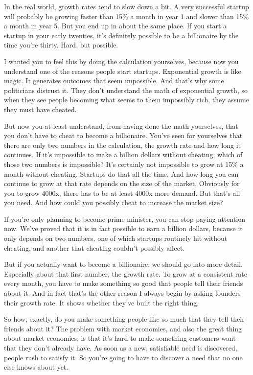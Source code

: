 \documentclass[12pt]{book}
\begin{document}
In the real world, growth rates tend to slow down a bit. A very
successful startup will probably be growing faster than 15\% a month in
year 1 and slower than 15\% a month in year 5. But you end up in about
the same place. If you start a startup in your early twenties, it's
definitely possible to be a billionaire by the time you're thirty. Hard,
but possible.

I wanted you to feel this by doing the calculation yourselves, because
now you understand one of the reasons people start startups. Exponential
growth is like magic. It generates outcomes that seem impossible. And
that's why some politicians distrust it. They don't understand the math
of exponential growth, so when they see people becoming what seems to
them impossibly rich, they assume they must have cheated.

But now you at least understand, from having done the math yourselves,
that you don't have to cheat to become a billionaire. You've seen for
yourselves that there are only two numbers in the calculation, the
growth rate and how long it continues. If it's impossible to make a
billion dollars without cheating, which of those two numbers is
impossible? It's certainly not impossible to grow at 15\% a month
without cheating. Startups do that all the time. And how long you can
continue to grow at that rate depends on the size of the market.
Obviously for you to grow 4000x, there has to be at least 4000x more
demand. But that's all you need. And how could you possibly cheat to
increase the market size?

If you're only planning to become prime minister, you can stop paying
attention now. We've proved that it is in fact possible to earn a
billion dollars, because it only depends on two numbers, one of which
startups routinely hit without cheating, and another that cheating
couldn't possibly affect.

But if you actually want to become a billionaire, we should go into more
detail. Especially about that first number, the growth rate. To grow at
a consistent rate every month, you have to make something so good that
people tell their friends about it. And in fact that's the other reason
I always begin by asking founders their growth rate. It shows whether
they've built the right thing.

So how, exactly, do you make something people like so much that they
tell their friends about it? The problem with market economies, and also
the great thing about market economies, is that it's hard to make
something customers want that they don't already have. As soon as a new,
satisfiable need is discovered, people rush to satisfy it. So you're
going to have to discover a need that no one else knows about yet.
\end{document}
